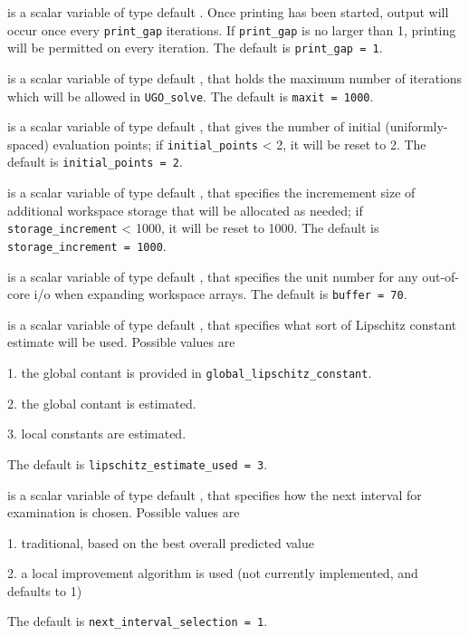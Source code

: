 \documentclass{galahad}
\newcommand{\packagename}{UGO}
\begin{document}
\begin{description}
 is a scalar variable of type default \integer.
Once printing has been started, output will occur once every
{\tt print\_gap} iterations. If {\tt print\_gap} is no larger than 1,
printing will be permitted on every iteration.
The default is {\tt print\_gap = 1}.

 is a scalar variable of type default \integer, that holds the
maximum number of iterations which will be allowed in {\tt \packagename\_solve}.
The default is {\tt maxit = 1000}.

 is a scalar variable of type default \integer, that
gives the number of initial (uniformly-spaced) evaluation points; if
{\tt initial\_points} < 2, it will be reset to 2.
The default is {\tt initial\_points = 2}.

 is a scalar variable of type default \integer, that
specifies the incremement size of additional workspace storage that will be
allocated as needed; if {\tt storage\_increment} < 1000, it will be reset
to 1000.
The default is {\tt storage\_increment = 1000}.

 is a scalar variable of type default \integer, that specifies
the unit number for any out-of-core i/o when expanding workspace arrays.
The default is {\tt buffer = 70}.

 is a scalar variable of type default \integer,
that specifies what sort of Lipschitz constant estimate will be used.
Possible values are
\begin{description}
\item 1. the  global contant is provided in {\tt global\_lipschitz\_constant}.
\item 2. the global contant is estimated.
\item 3. local constants are estimated.
\end{description}
The default is {\tt lipschitz\_estimate\_used = 3}.

 is a scalar variable of type default \integer,
that specifies how the next interval for examination is chosen. Possible
values are
\begin{description}
\item 1. traditional, based on the best overall predicted value
\item 2. a local improvement algorithm is used (not currently implemented,
  and defaults to 1)
\end{description}
The default is {\tt next\_interval\_selection = 1}.


\end{description}
\end{document}
